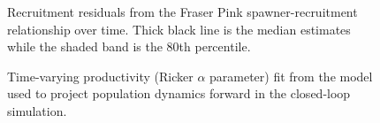 \documentclass[11pt]{book}
\begin{document}
\begin{figure}[htb]

{\centering {} 

}

\caption{Recruitment residuals from the Fraser Pink spawner-recruitment relationship over time. Thick black line is the median estimates while the shaded band is the 80th percentile.}\label{fig:fig-rec-resid}
\end{figure}

\begin{figure}[htb]

{\centering {} 

}

\caption{Time-varying productivity (Ricker \(\alpha\) parameter) fit from the model used to project population dynamics forward in the closed-loop simulation.}\label{fig:fig-tv-alpha}
\end{figure}
\end{document}
